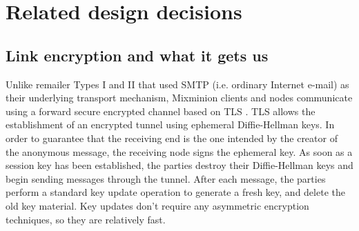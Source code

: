 \documentclass[11pt]{IEEEtran}
\begin{document}
\section{Related design decisions}


\subsection{Link encryption and what it gets us}
\label{subsec:link-encrypt}

Unlike remailer Types I and II that used SMTP \cite{SMTP} (i.e. ordinary
Internet e-mail) as their underlying transport mechanism, Mixminion
clients and nodes communicate using a forward secure encrypted channel
based on TLS \cite{TLS}.  
TLS allows the establishment of an encrypted tunnel using ephemeral
Diffie-Hellman keys. In order to guarantee that the receiving end is
the one intended by the creator of the anonymous message, the
receiving node signs the ephemeral key. As soon as a session key
has been established, the parties destroy their Diffie-Hellman keys
and begin sending messages through the tunnel. After each message, the
parties perform a standard key update operation to generate a fresh
key, and delete the old key material.  Key updates don't require any
asymmetric encryption techniques, so they are relatively fast.

%


%
\end{document}
